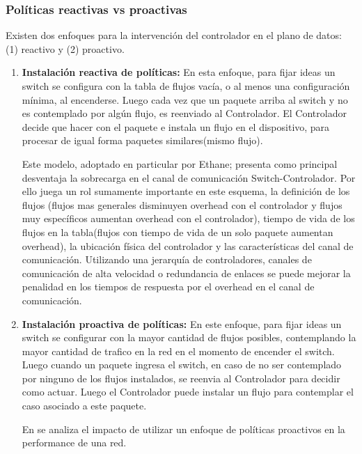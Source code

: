 \subsubsection{Políticas reactivas vs proactivas}
Existen dos enfoques para la intervención del controlador en el plano de datos: (1) reactivo y (2) proactivo.

\begin{enumerate}
\item \textbf{Instalación reactiva de políticas:} En esta enfoque, para fijar ideas un switch se configura con la tabla de flujos vac\'ia, o al menos una configuración mínima, al encenderse. Luego cada vez que un paquete arriba al switch y no es contemplado por algún flujo, es reenviado al Controlador. El Controlador decide que hacer con el paquete e instala un flujo en el dispositivo, para procesar de igual forma paquetes similares(mismo flujo).

Este modelo, adoptado en particular por Ethane\cite{casado2007ethane}; presenta como principal desventaja la sobrecarga en el canal de comunicación Switch-Controlador. Por ello juega un rol sumamente importante en este esquema, la definición de los flujos (flujos mas generales disminuyen overhead con el controlador y flujos muy específicos aumentan overhead con el controlador), tiempo de vida de los flujos en la tabla(flujos con tiempo de vida de un solo paquete aumentan overhead), la ubicación física del controlador y las características del canal de comunicación. Utilizando una jerarquía de controladores, canales de comunicación de alta velocidad o redundancia de enlaces se puede mejorar la penalidad en los tiempos de respuesta por el overhead en el canal de comunicación. 

\item \textbf{Instalación proactiva de políticas:} En este enfoque, para fijar ideas un switch se configurar con la mayor cantidad de flujos posibles, contemplando la mayor cantidad de trafico en la red en el momento de encender el switch. Luego cuando un paquete ingresa el switch, en caso de no ser contemplado por ninguno de los flujos instalados, se reenvia al Controlador para decidir como actuar. Luego el Controlador puede instalar un flujo para contemplar el caso asociado a este paquete. 

En \cite{yu2011scalable} se analiza el impacto de utilizar un enfoque de políticas proactivos en la performance de una red.  

\end{enumerate} 

